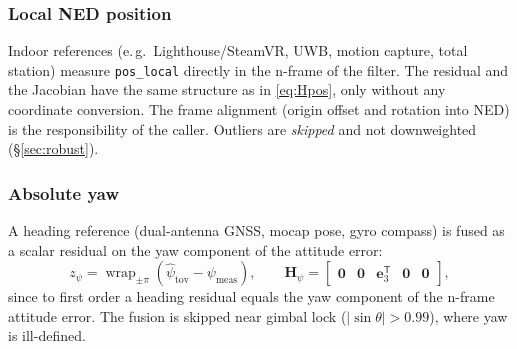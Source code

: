 \documentclass[11pt,a4paper]{article}
\newcommand{\vect}[1]{\bm{#1}}
\newcommand{\mat}[1]{\bm{#1}}
\newcommand{\T}{^{\mathsf{T}}}
\newcommand{\code}[1]{\texttt{#1}}
\begin{document}
\subsubsection{Local NED position}

Indoor references (e.\,g.\ Lighthouse/SteamVR, UWB, motion capture, total
station) measure \code{pos\_\allowbreak{}local} directly in the n-frame of the
filter. The residual and the Jacobian have the same structure as in
\eqref{eq:Hpos}, only without any coordinate conversion. The frame alignment
(origin offset and rotation into NED) is the responsibility of the caller.
Outliers are \emph{skipped} and not downweighted (\S\ref{sec:robust}).

\subsubsection{Absolute yaw}
\label{sec:ins-yaw}

A heading reference (dual-antenna GNSS, mocap pose, gyro compass) is
fused as a scalar residual on the yaw component of the attitude error:
\begin{equation}
  z_\psi = \operatorname{wrap}_{\pm\pi}
    \left(\hat{\psi}_{\text{tov}} - \psi_{\text{meas}}\right),
  \qquad
  \mat{H}_\psi = \begin{bmatrix}
    \mat{0} & \mat{0} & \vect{e}_3\T & \mat{0} & \mat{0}
  \end{bmatrix},
\end{equation}
since to first order a heading residual equals the yaw component of the
n-frame attitude error. The fusion is skipped near gimbal lock
($|\sin\theta| > 0.99$), where yaw is ill-defined.
\end{document}
